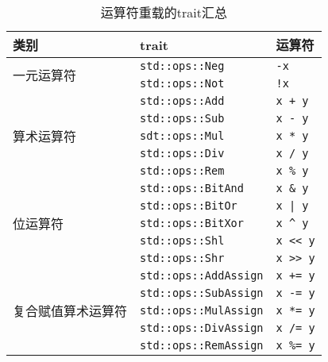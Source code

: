 \begin{table}[htbp]
    \centering
    \caption{运算符重载的trait汇总}
    \label{t12-1}
    \begin{tabular}{lll}
        \hline
        \textbf{类别}   & \textbf{trait}    & \textbf{运算符}   \\
        \hline

        \multirow{2}{*}{一元运算符} & \texttt{std::ops::Neg}    & \texttt{-x}   \\
        & \texttt{std::ops::Not} \cellcolor{tablecolor} & \texttt{!x} \cellcolor{tablecolor}  \\
        \hline

        \multirow{5}{*}{算术运算符} & \texttt{std::ops::Add}    & \texttt{x + y}\\
        & \texttt{std::ops::Sub} \cellcolor{tablecolor} & \texttt{x - y} \cellcolor{tablecolor} \\
        & \texttt{sdt::ops::Mul}    & \texttt{x * y}\\
        & \texttt{std::ops::Div} \cellcolor{tablecolor} & \texttt{x / y} \cellcolor{tablecolor} \\
        & \texttt{std::ops::Rem}    & \texttt{x \% y}   \\
        \hline
        
        \multirow{5}{*}{位运算符}   & \texttt{std::ops::BitAnd} \cellcolor{tablecolor} & \texttt{x \& y} \cellcolor{tablecolor} \\
        & \texttt{std::ops::BitOr}  & \texttt{x | y}    \\
        & \texttt{std::ops::BitXor} \cellcolor{tablecolor} & \texttt{x \^{} y} \cellcolor{tablecolor} \\
        & \texttt{std::ops::Shl}    & \texttt{x << y}   \\
        & \texttt{std::ops::Shr}    \cellcolor{tablecolor} & \texttt{x >> y} \cellcolor{tablecolor} \\
        \hline

        \multirow{5}{*}{复合赋值算术运算符}  & \texttt{std::ops::AddAssign} & \texttt{x += y} \\
        & \texttt{std::ops::SubAssign} \cellcolor{tablecolor} & \texttt{x -= y} \cellcolor{tablecolor} \\
        & \texttt{std::ops::MulAssign}  & \texttt{x *= y}  \\
        & \texttt{std::ops::DivAssign} \cellcolor{tablecolor} & \texttt{x /= y} \cellcolor{tablecolor} \\
        & \texttt{std::ops::RemAssign}  & \texttt{x \%= y} \\
        \hline


\end{tabular}
\end{table}
